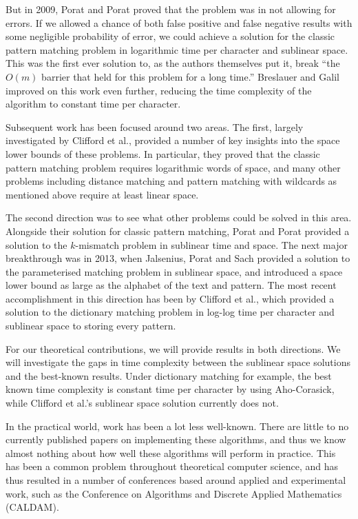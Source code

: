 \documentclass[a4paper,11pt]{article}
\begin{document}
    But in 2009, Porat and Porat \cite{5438620} proved that the problem was in not allowing for errors. If we allowed a chance of both false positive and false negative results with some negligible probability of error, we could achieve a solution for the classic pattern matching problem in logarithmic time per character and sublinear space. This was the first ever solution to, as the authors themselves put it, break ``the $O(m)$ barrier that held for this problem for a long time.'' Breslauer and Galil \cite{Breslauer:2014:RSS:2660854.2635814} improved on this work even further, reducing the time complexity of the algorithm to constant time per character.

    Subsequent work has been focused around two areas. The first, largely investigated by Clifford et al.\@ \cite{DBLP:journals/corr/abs-1106-4412}, provided a number of key insights into the space lower bounds of these problems. In particular, they proved that the classic pattern matching problem requires logarithmic words of space, and many other problems including distance matching and pattern matching with wildcards as mentioned above require at least linear space.

    The second direction was to see what other problems could be solved in this area. Alongside their solution for classic pattern matching, Porat and Porat \cite{5438620} provided a solution to the $k$-mismatch problem in sublinear time and space. The next major breakthrough was in 2013, when Jalsenius, Porat and Sach \cite{JPS:2013} provided a solution to the parameterised matching problem in sublinear space, and introduced a space lower bound as large as the alphabet of the text and pattern. The most recent accomplishment in this direction has been by Clifford et al.\@ \cite{2015arXiv150406242C}, which provided a solution to the dictionary matching problem in log-log time per character and sublinear space to storing every pattern.

    For our theoretical contributions, we will provide results in both directions. We will investigate the gaps in time complexity between the sublinear space solutions and the best-known results. Under dictionary matching for example, the best known time complexity is constant time per character by using Aho-Corasick, while Clifford et al.'s sublinear space solution currently does not.

    In the practical world, work has been a lot less well-known. There are little to no currently published papers on implementing these algorithms, and thus we know almost nothing about how well these algorithms will perform in practice. This has been a common problem throughout theoretical computer science, and has thus resulted in a number of conferences based around applied and experimental work, such as the Conference on Algorithms and Discrete Applied Mathematics (CALDAM).
\end{document}

